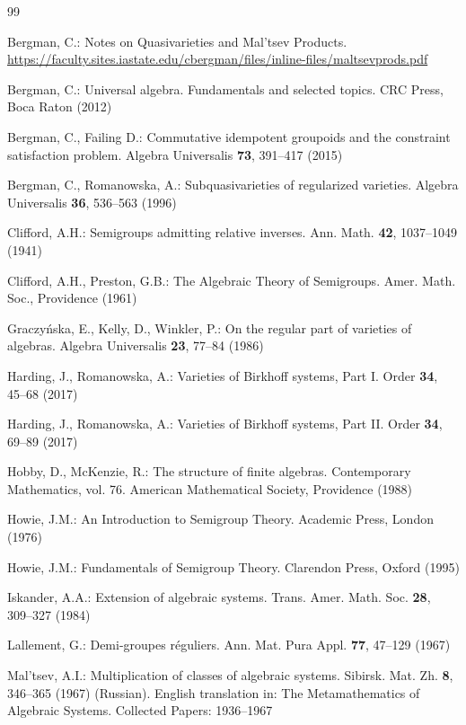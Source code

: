 \documentclass{birkau}
\theoremstyle{plain}
\theoremstyle{definition}
\numberwithin{equation}{section}
\begin{document}
\begin{thebibliography}{99}

Bergman, C.:
Notes on Quasivarieties and Mal'tsev Products.
\url{https://faculty.sites.iastate.edu/cbergman/files/inline-files/maltsevprods.pdf}

Bergman, C.:
Universal algebra. Fundamentals and selected topics.
CRC Press, Boca Raton (2012)

Bergman, C., Failing D.:
Commutative idempotent groupoids and the constraint satisfaction problem.
Algebra Universalis \textbf{73}, 391--417 (2015)


Bergman, C., Romanowska, A.:
Subquasivarieties of regularized varieties.
Algebra Universalis \textbf{36}, 536--563 (1996)


Clifford, A.H.:
Semigroups admitting relative inverses.
Ann. Math. \textbf{42}, 1037--1049 (1941)

Clifford, A.H., Preston, G.B.:
The Algebraic Theory of Semigroups.
Amer. Math. Soc., Providence (1961)

Graczy\'{n}ska, E., Kelly, D., Winkler, P.:
On the regular part of varieties of algebras.
Algebra Universalis \textbf{23}, 77--84 (1986)


Harding, J., Romanowska, A.:
Varieties of Birkhoff systems, Part I.
Order \textbf{34}, 45--68 (2017)

Harding, J., Romanowska, A.:
Varieties of Birkhoff systems, Part II.
Order \textbf{34}, 69--89 (2017)

Hobby, D., McKenzie, R.:
The structure of finite algebras. Contemporary Mathematics, vol. 76.  
 American Mathematical Society, Providence  (1988)


Howie, J.M.:
An Introduction to Semigroup Theory.
Academic Press, London (1976)

Howie, J.M.:
Fundamentals of Semigroup Theory.
Clarendon Press, Oxford (1995)


Iskander, A.A.:
Extension of algebraic systems.
Trans. Amer. Math. Soc. \textbf{28}, 309--327 (1984)


Lallement, G.:
Demi-groupes r\' {e}guliers.
Ann. Mat. Pura Appl. \textbf{77}, 47--129 (1967)

Mal'tsev, A.I.:
Multiplication of classes of algebraic systems. 
Sibirsk. Mat. Zh. \textbf{8}, 346--365 (1967) (Russian).
English translation in: The Metamathematics of Algebraic Systems. Collected Papers: 1936--1967


\end{thebibliography}
\end{document}
